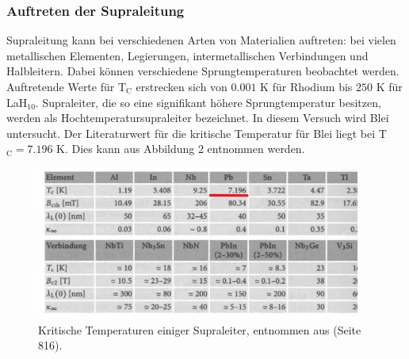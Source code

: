 \documentclass[german,  %
parskip=full,  %
]{scrartcl}
\begin{document}
\subsubsection{Auftreten der Supraleitung}
Supraleitung kann bei verschiedenen Arten von Materialien auftreten: bei vielen metallischen Elementen, Legierungen, intermetallischen Verbindungen und Halbleitern. Dabei können verschiedene Sprungtemperaturen beobachtet werden. Auftretende Werte für T$_{\text{C}}$ erstrecken sich von $0.001$ K für Rhodium bis $250$ K für LaH$_{10}$.  Supraleiter, die so eine signifikant höhere Sprungtemperatur besitzen, werden als Hochtemperatursupraleiter bezeichnet.
\newpage
In diesem Versuch wird Blei untersucht. Der Literaturwert für die kritische Temperatur für Blei liegt bei T$_{\text{C}} = 7.196$ K. Dies kann aus Abbildung 2 entnommen werden.
\begin{figure}[h!]
\centering
\includegraphics[width=0.95\textwidth]{tab}
\caption{Kritische Temperaturen einiger Supraleiter, entnommen aus \cite{6} (Seite 816).}
\end{figure}
\end{document}
